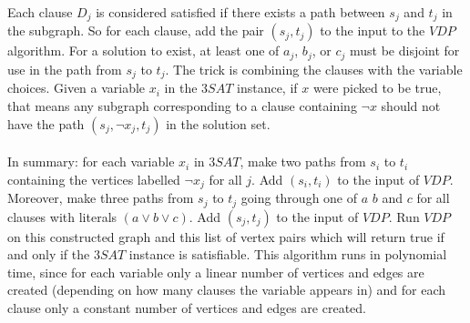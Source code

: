 \documentclass[letterpaper,notitlepage,twoside]{article}
\begin{document}
Each clause $D_j$ is considered satisfied if there exists a path between $s_j$ and $t_j$ in the subgraph. So for each clause, add the pair $(s_j, t_j)$ to the input to the $VDP$ algorithm. For a solution to exist, at least one of $a_j$, $b_j$, or $c_j$ must be disjoint for use in the path from $s_j$ to $t_j$. The trick is combining the clauses with the variable choices. Given a variable $x_i$ in the $3SAT$ instance, if $x$ were picked to be true, that means any subgraph corresponding to a clause containing $\neg x$ should not have the path $(s_j, \neg x_j, t_j)$ in the solution set.
\\\\
In summary: for each variable $x_i$ in $3SAT$, make two paths from $s_i$ to $t_i$ containing the vertices labelled $\neg x_j$ for all $j$. Add $(s_i, t_i)$ to the input of $VDP$. Moreover, make three paths from $s_j$ to $t_j$ going through one of $a$ $b$ and $c$ for all clauses with literals $(a \lor b \lor c)$. Add $(s_j, t_j)$ to the input of $VDP$. Run $VDP$ on this constructed graph and this list of vertex pairs which will return true if and only if the $3SAT$ instance is satisfiable. This algorithm runs in polynomial time, since for each variable only a linear number of vertices and edges are created (depending on how many clauses the variable appears in) and for each clause only a constant number of vertices and edges are created.
\end{document}
